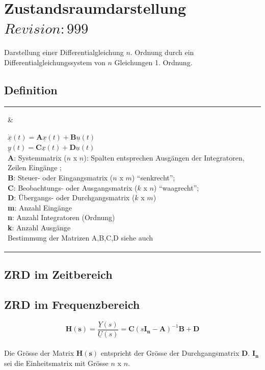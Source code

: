 \section{Zustandsraumdarstellung  \tiny{$Revision: 999 $}}
Darstellung einer Differentialgleichung $n$. Ordnung durch ein
Differentialgleichungssystem von $n$ Gleichungen 1. Ordnung.

\subsection{Definition }
\begin{tabular}{ll}
\parbox{10cm}{
	
	}
	& \parbox{8cm}{
		$\dot{\underline{x}}(t) = {\boldsymbol A} \underline{x}(t) + {\boldsymbol B}
		\underline{u}(t)$ \\
		$\underline{y}(t) = {\boldsymbol C} \underline{x}(t) + {\boldsymbol D}
		\underline{u}(t)$\\ 
		
		${\boldsymbol A}$: Systemmatrix ($n$ x $n$): Spalten entsprechen Ausgängen
		der Integratoren, Zeilen Eingänge ; \\ 
		${\boldsymbol B}$: Steuer- oder
		Eingangsmatrix ($n$ x $m$) ``senkrecht''; \\ ${\boldsymbol C}$: Beobachtungs- oder Ausgangsmatrix ($k$ x $n$)
		``waagrecht''; \\
		${\boldsymbol D}$: Übergangs- oder Durchgangsmatrix ($k$ x
		$m$)\\
		
		\textbf{m}: Anzahl Eingänge \\
		\textbf{n}: Anzahl Integratoren (Ordnung) \\
		\textbf{k}: Anzahl Ausgänge\\
	Bestimmung der Matrizen A,B,C,D siehe auch 
	}
 \end{tabular}

\subsection{ZRD im Zeitbereich }

\subsection{ZRD im Frequenzbereich  }
$$\boldsymbol{H(s)} = \frac{\underline{Y}(s)}{\underline{U}(s)} =
\boldsymbol{C}\left(s\boldsymbol{I_n}-\boldsymbol{A}\right)^{-1}\boldsymbol{B}+\boldsymbol{D}$$
\\
Die Grösse der Matrix $\boldsymbol {H(s)}$ entspricht der Grösse der
Durchgangsmatrix $\boldsymbol D$. $\boldsymbol{I_n}$ sei die Einheitsmatrix mit
Grösse $n$ x $n$.

